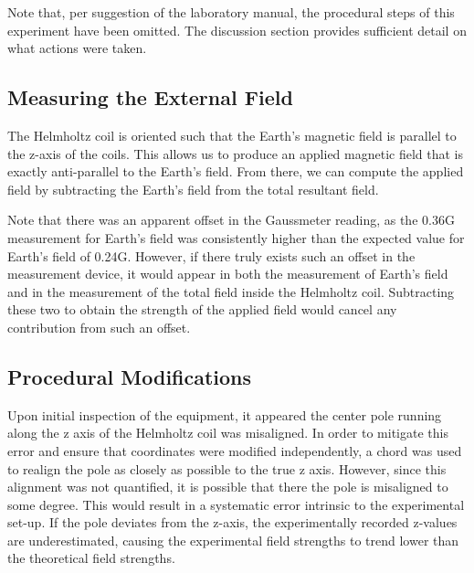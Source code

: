 \documentclass[a4paper]{article}
\begin{document}
\begin{itemize}
Note that, per suggestion of the laboratory manual, the procedural
steps of this experiment have been omitted. The discussion section
provides sufficient detail on what actions were taken.

\subsection{Measuring the External Field}
The Helmholtz coil is oriented such that the Earth's magnetic field is
parallel to the z-axis of the coils. This allows us to produce an
applied magnetic field that is exactly anti-parallel to the Earth's
field. From there, we can compute the applied field by subtracting the
Earth's field from the total resultant field.

Note that there was an apparent offset in the Gaussmeter reading, as
the 0.36G measurement for Earth's field was consistently higher than
the expected value for Earth's field of 0.24G. However, if there truly
exists such an offset in the measurement device, it would appear in
both the measurement of Earth's field and in the measurement of the
total field inside the Helmholtz coil. Subtracting these two to obtain
the strength of the applied field would cancel any contribution from
such an offset.

\subsection{Procedural Modifications}

Upon initial inspection of the equipment, it appeared the center pole
running along the z axis of the Helmholtz coil was misaligned. In
order to mitigate this error and ensure that coordinates were modified
independently, a chord was used to realign the pole as closely as
possible to the true z axis. However, since this alignment was not
quantified, it is possible that there the pole is misaligned to some
degree. This would result in a systematic error intrinsic to the
experimental set-up. If the pole deviates from the z-axis, the
experimentally recorded z-values are underestimated, causing the
experimental field strengths to trend lower than the theoretical field
strengths.


\end{itemize}
\end{document}

